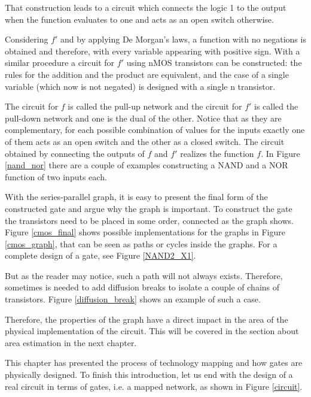 \documentclass{fmetfm}
\begin{document}
That construction leads to a circuit which connects the logic 1 to the output when the function evaluates to one and acts as an open switch otherwise.

Considering $f'$ and by applying De Morgan's laws, a function with no negations is obtained and therefore, with every variable appearing with positive sign. With a similar procedure a circuit for $f'$ using nMOS transistors can be constructed: the rules for the addition and the product are equivalent, and the case of a single variable (which now is not negated) is designed with a single n transistor.

The circuit for $f$ is called the pull-up network and the circuit for $f'$ is called the pull-down network and one is the dual of the other. Notice that as they are complementary, for each possible combination of values for the inputs exactly one of them acts as an open switch and the other as a closed switch. The circuit obtained by connecting the outputs of $f$ and $f'$ realizes the function $f$. In Figure \ref{nand_nor} there are a couple of examples constructing a NAND and a NOR function of two inputs each.


With the series-parallel graph, it is easy to present the final form of the constructed gate and argue why the graph is important. To construct the gate the transistors need to be placed in some order, connected as the graph shows. Figure \ref{cmos_final} shows possible implementations for the graphs in Figure \ref{cmos_graph}, that can be seen as paths or cycles inside the graphs. For a complete design of a gate, see Figure \ref{NAND2_X1}. 

But as the reader may notice, such a path will not always exists. Therefore, sometimes is needed to add diffusion breaks to isolate a couple of chains of transistors. Figure \ref{diffusion_break} shows an example of such a case.

Therefore, the properties of the graph have a direct impact in the area of the physical implementation of the circuit. This will be covered in the section about area estimation in the next chapter.

This chapter has presented the process of technology mapping and how gates are physically designed. To finish this introduction, let us end with the design of a real circuit in terms of gates, i.e. a mapped network, as shown in Figure \ref{circuit}.




%
\end{document}
